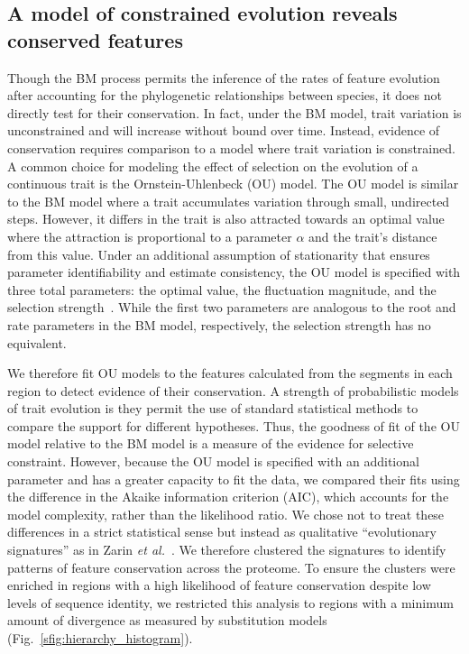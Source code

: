 \subsection{A model of constrained evolution reveals conserved features}
Though the BM process permits the inference of the rates of feature evolution after accounting for the phylogenetic relationships between species, it does not directly test for their conservation. In fact, under the BM model, trait variation is unconstrained and will increase without bound over time. Instead, evidence of conservation requires comparison to a model where trait variation is constrained. A common choice for modeling the effect of selection on the evolution of a continuous trait is the Ornstein-Uhlenbeck (OU) model. The OU model is similar to the BM model where a trait accumulates variation through small, undirected steps. However, it differs in the trait is also attracted towards an optimal value where the attraction is proportional to a parameter $\alpha$ and the trait's distance from this value. Under an additional assumption of stationarity that ensures parameter identifiability and estimate consistency, the OU model is specified with three total parameters: the optimal value, the fluctuation magnitude, and the selection strength~\cite{Ho2013, Ho2014}. While the first two parameters are analogous to the root and rate parameters in the BM model, respectively, the selection strength has no equivalent.

We therefore fit OU models to the features calculated from the segments in each region to detect evidence of their conservation. A strength of probabilistic models of trait evolution is they permit the use of standard statistical methods to compare the support for different hypotheses. Thus, the goodness of fit of the OU model relative to the BM model is a measure of the evidence for selective constraint. However, because the OU model is specified with an additional parameter and has a greater capacity to fit the data, we compared their fits using the difference in the Akaike information criterion (AIC), which accounts for the model complexity, rather than the likelihood ratio. We chose not to treat these differences in a strict statistical sense but instead as qualitative ``evolutionary signatures'' as in Zarin \textit{et al.}~\cite{Zarin2019}. We therefore clustered the signatures to identify patterns of feature conservation across the proteome. To ensure the clusters were enriched in regions with a high likelihood of feature conservation despite low levels of sequence identity, we restricted this analysis to regions with a minimum amount of divergence as measured by substitution models (Fig.~\ref{sfig:hierarchy_histogram}).

